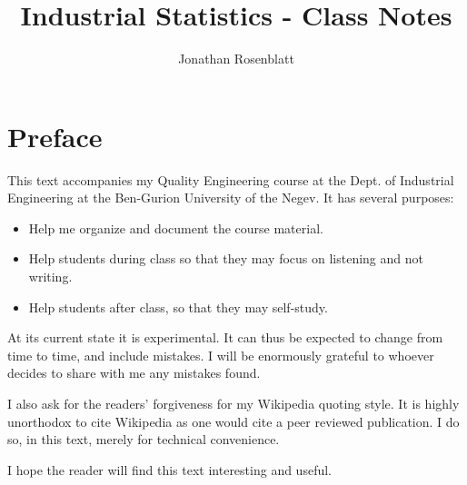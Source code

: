 \documentclass[12pt,a4paper]{report}
\author{Jonathan Rosenblatt}
\title{Industrial Statistics - Class Notes}
\begin{document}
\maketitle


\chapter*{Preface}
This text accompanies my Quality Engineering course at the Dept. of Industrial Engineering at the Ben-Gurion University of the Negev.
It has several purposes:
\begin{itemize}
\item Help me organize and document the course material.
\item Help students during class so that they may focus on listening and not writing.
\item Help students after class, so that they may self-study.
\end{itemize}

At its current state it is experimental. 
It can thus be expected to change from time to time, and include mistakes.
I will be enormously grateful to whoever decides to share with me any mistakes found.

I also ask for the readers' forgiveness for my Wikipedia quoting style. 
It is highly unorthodox to cite Wikipedia as one would cite a peer reviewed publication. 
I do so, in this text, merely for technical convenience. 

I hope the reader will find this text interesting and useful. 




\tableofcontents

\listoffigures

\renewcommand{\listtheoremname}{List of Definitions}
\listoftheorems[ignoreall,show={definition}]

\renewcommand{\listtheoremname}{List of Examples}
\listoftheorems[ignoreall,show={example}]













\end{document}

